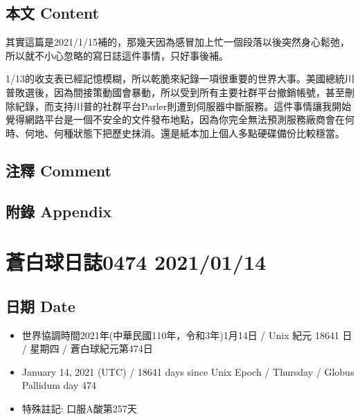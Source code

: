 \documentclass[a5paper, 10pt
]{book}
\providecommand{\tightlist}{%
  \setlength{\itemsep}{0pt}\setlength{\parskip}{0pt}}
\begin{document}
\hypertarget{ux672cux6587-content-43}{%
\subsection{本文 Content}\label{ux672cux6587-content-43}}

其實這篇是2021/1/15補的，那幾天因為感冒加上忙一個段落以後突然身心鬆弛，所以就不小心忽略的寫日誌這件事情，只好事後補。

1/13的收支表已經記憶模糊，所以乾脆來紀錄一項很重要的世界大事。美國總統川普敗選後，因為間接策動國會暴動，所以受到所有主要社群平台撤銷帳號，甚至刪除紀錄，而支持川普的社群平台Parler則遭到伺服器中斷服務。這件事情讓我開始覺得網路平台是一個不安全的文件發布地點，因為你完全無法預測服務廠商會在何時、何地、何種狀態下把歷史抹消。還是紙本加上個人多點硬碟備份比較穩當。

\hypertarget{ux6ce8ux91cb-comment-43}{%
\subsection{注釋 Comment}\label{ux6ce8ux91cb-comment-43}}

\hypertarget{ux9644ux9304-appendix-43}{%
\subsection{附錄 Appendix}\label{ux9644ux9304-appendix-43}}

\hypertarget{ux84bcux767dux7403ux65e5ux8a8c0474-20210114}{%
\section{蒼白球日誌0474
2021/01/14}\label{ux84bcux767dux7403ux65e5ux8a8c0474-20210114}}

\hypertarget{ux65e5ux671f-date-44}{%
\subsection{日期 Date}\label{ux65e5ux671f-date-44}}

\begin{itemize}
\tightlist
\item
  世界協調時間2021年(中華民國110年，令和3年)1月14日 / Unix 紀元 18641 日
  / 星期四 / 蒼白球紀元第474日
\item
  January 14, 2021 (UTC) / 18641 days since Unix Epoch / Thursday /
  Globus Pallidum day 474
\item
  特殊註記: 口服A酸第257天
\end{itemize}
\end{document}

